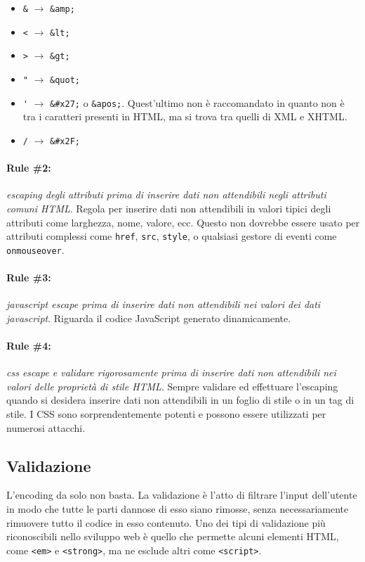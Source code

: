 \begin{itemize}
      \item \verb|&| $\rightarrow$ \verb|&amp;|
      \item \verb|<| $\rightarrow$ \verb|&lt;|
      \item \verb|>| $\rightarrow$ \verb|&gt;|
      \item \verb|"| $\rightarrow$ \verb|&quot;|
      \item \verb|'| $\rightarrow$ \verb|&#x27;| o \verb|&apos;|. Quest'ultimo
            non è raccomandato in quanto non è tra i caratteri presenti in HTML, ma si trova
            tra quelli di XML e XHTML.
      \item \verb|/| $\rightarrow$ \verb|&#x2F;|
\end{itemize}

\paragraph{Rule \#2:} \textit{escaping degli attributi prima di inserire dati non
      attendibili negli attributi comuni HTML}.
Regola per inserire dati non attendibili in valori tipici degli attributi come
larghezza, nome,
valore, ecc. Questo non dovrebbe essere usato per attributi complessi come
\verb|href|, \verb|src|, \verb|style|,
o qualsiasi gestore di eventi come \verb|onmouseover|.

\paragraph{Rule \#3:} \textit{javascript escape prima di inserire dati non attendibili
      nei valori dei dati javascript}.
Riguarda il codice JavaScript generato dinamicamente.

\paragraph{Rule \#4:} \textit{css escape e validare rigorosamente prima di inserire
      dati non attendibili nei valori delle proprietà di stile HTML}.
Sempre validare ed effettuare l'escaping quando si desidera inserire dati non
attendibili in un foglio di stile o in un
tag di stile. I CSS
sono sorprendentemente potenti e possono essere utilizzati per numerosi attacchi.

\subsection{Validazione}

L'encoding da solo non basta.
La validazione è l'atto di filtrare l'input dell'utente in modo che tutte le
parti dannose di esso
siano rimosse, senza necessariamente rimuovere tutto il codice in esso contenuto.
Uno dei
tipi di validazione più riconoscibili nello sviluppo web è quello che permette
alcuni elementi
HTML, come \verb|<em>| e \verb|<strong>|, ma ne esclude altri come \verb|<script>|.